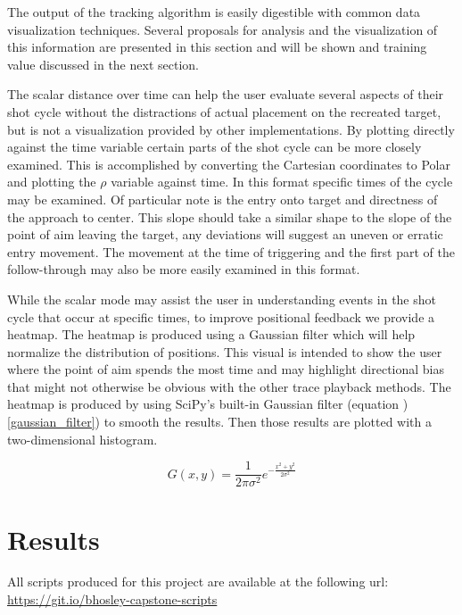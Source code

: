 \documentclass[conference]{IEEEtran}
\begin{document}
The output of the tracking algorithm is easily digestible with common data visualization techniques.
Several proposals for analysis and the visualization of this information are presented in this section and will be shown and training value discussed in the next section.

The scalar distance over time can help the user evaluate several aspects of their shot cycle without the distractions of actual placement on the recreated target,
but is not a visualization provided by other implementations.
By plotting directly against the time variable certain parts of the shot cycle
\cite{Zeljko2010,Zeljko2020}
can be more closely examined.
This is accomplished by converting the Cartesian coordinates to Polar and plotting the $\rho$ variable against time.
In this format specific times of the cycle may be examined.
Of particular note is the entry onto target and directness of the approach to center.
This slope should take a similar shape to the slope of the point of aim leaving the target, any deviations will suggest an uneven or erratic entry movement.
The movement at the time of triggering and the first part of the follow-through may also be more easily examined in this format.

While the scalar mode may assist the user in understanding events in the shot cycle that occur at specific times, to improve positional feedback we provide a heatmap.
The heatmap is produced using a Gaussian filter which will help normalize the distribution of positions.
This visual is intended to show the user where the point of aim spends the most time and may highlight directional bias that might not otherwise be obvious with the other trace playback methods.
The heatmap is produced by using SciPy's built-in Gaussian filter 
\cite{Nixon2019}(equation )\ref{gaussian_filter}) to smooth the results. 
Then those results are plotted with a two-dimensional histogram.

\begin{equation}\label{gaussian_filter}
	G(x,y) = \frac{1}{2 \pi \sigma^2} e^{ -\frac{x^2+y^2}{2\sigma^2} }
\end{equation}


\section{Results}

All scripts produced for this project are available at the following url: \href{https://git.io/bhosley-capstone-scripts}{https://git.io/bhosley-capstone-scripts}
\end{document}
